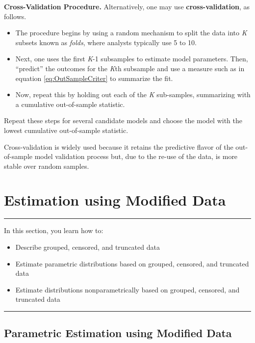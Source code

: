 \documentclass[]{book}
\providecommand{\tightlist}{%
  \setlength{\itemsep}{0pt}\setlength{\parskip}{0pt}}
\theoremstyle{definition}
\theoremstyle{definition}
\theoremstyle{definition}
\theoremstyle{remark}
\begin{document}
\textbf{Cross-Validation Procedure.} Alternatively, one may use
\textbf{cross-validation}, as follows.

\begin{itemize}
\tightlist
\item
  The procedure begins by using a random mechanism to split the data
  into \emph{K} subsets known as \emph{folds}, where analysts typically
  use 5 to 10.
\item
  Next, one uses the first \emph{K}-1 subsamples to estimate model
  parameters. Then, ``predict'' the outcomes for the \emph{K}th
  subsample and use a measure such as in equation
  \eqref{eq:OutSampleCriter} to summarize the fit.
\item
  Now, repeat this by holding out each of the \emph{K} sub-samples,
  summarizing with a cumulative out-of-sample statistic.
\end{itemize}

Repeat these steps for several candidate models and choose the model
with the lowest cumulative out-of-sample statistic.

Cross-validation is widely used because it retains the predictive flavor
of the out-of-sample model validation process but, due to the re-use of
the data, is more stable over random samples.

\section{Estimation using Modified Data}\label{S:MS:ModifiedData}

\begin{center}\rule{0.5\linewidth}{\linethickness}\end{center}

In this section, you learn how to:

\begin{itemize}
\tightlist
\item
  Describe grouped, censored, and truncated data
\item
  Estimate parametric distributions based on grouped, censored, and
  truncated data
\item
  Estimate distributions nonparametrically based on grouped, censored,
  and truncated data
\end{itemize}

\begin{center}\rule{0.5\linewidth}{\linethickness}\end{center}

\subsection{Parametric Estimation using Modified
Data}\label{parametric-estimation-using-modified-data}
\end{document}
